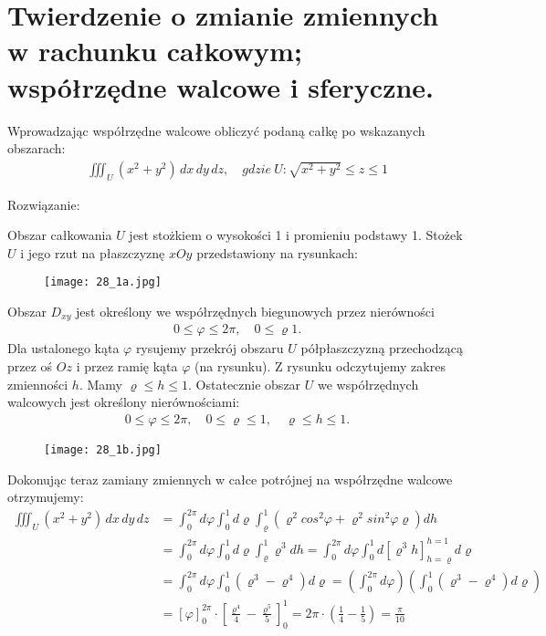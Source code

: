 \documentclass[main.tex]{subfiles}
\begin{document}
    \section{Twierdzenie o zmianie zmiennych w rachunku całkowym; współrzędne walcowe i sferyczne.}

    \begin{exercise}
        Wprowadzając współrzędne walcowe obliczyć podaną całkę po wskazanych obszarach:
        \begin{align*}
            \iiint_U (x^2+y^2) \,dx\,dy\,dz, \quad gdzie \ U: \sqrt{x^2+y^2} \leq z \leq 1
        \end{align*}
    \end{exercise}

    Rozwiązanie:

    Obszar całkowania $U$ jest stożkiem o wysokości 1 i promieniu podstawy 1. Stożek $U$ i jego rzut na płaszczyznę $xOy$ przedstawiony na rysunkach:
    \begin{figure}[H]
        \texttt{[image: 28\_1a.jpg]}
    \end{figure}

    Obszar $D_{xy}$ jest określony we współrzędnych biegunowych przez nierówności
    \begin{align*}
        0 \leq \varphi \leq 2\pi, \quad 0 \leq \varrho 1 .
    \end{align*}
    Dla ustalonego kąta $\varphi$ rysujemy przekrój obszaru $U$ półpłaszczyzną przechodzącą przez oś $Oz$ i przez ramię kąta $\varphi$ (na rysunku). Z rysunku odczytujemy zakres zmienności $h$. Mamy $\varrho \leq h \leq 1$. Ostatecznie obszar $U$ we współrzędnych walcowych jest określony nierównościami:
    \begin{align*}
        0 \leq \varphi \leq 2\pi, \quad 0 \leq \varrho \leq 1, \quad \varrho \leq h \leq 1.
    \end{align*}

    \begin{figure}[H]
        \texttt{[image: 28\_1b.jpg]}
    \end{figure}

    Dokonując teraz zamiany zmiennych w całce potrójnej na współrzędne walcowe otrzymujemy:
    \begin{align*}
        \iiint_U (x^2+y^2) \,dx\,dy\,dz &= \int_{0}^{2\pi} d\varphi \int_{0}^{1} d\varrho \int_{\varrho}^{1} (\varrho^2 cos^2\varphi+\varrho^2sin^2\varphi \varrho) dh
        \\ &= \int_{0}^{2\pi} d\varphi \int_{0}^{1} d\varrho \int_{\varrho}^{1} \varrho^3 dh = \int_{0}^{2\pi} d\varphi \int_{0}^{1} d \left[ \varrho^3 h \right]_{h=\varrho}^{h=1} d\varrho
        \\ &= \int_{0}^{2\pi} d\varphi \int_{0}^{1} (\varrho^3 - \varrho^4) d\varrho  = \left(\int_{0}^{2\pi}d\varphi\right) \left( \int_{0}^{1} (\varrho^3 - \varrho^4) d\varrho\right)
        \\ &= \left[\varphi\right]_0^{2\pi} \cdot \left[\frac{\varrho^4}{4} - \frac{\varrho^5}{5}\right]_0^1 = 2\pi \cdot \left(\frac{1}{4}-\frac{1}{5}\right) = \frac{\pi}{10}
    \end{align*}
\end{document}
